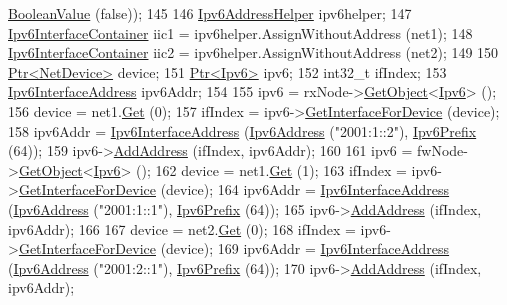 \begin{DoxyCode}
      \hyperlink{classns3_1_1BooleanValue}{BooleanValue} (\textcolor{keyword}{false}));
145 
146   \hyperlink{classns3_1_1Ipv6AddressHelper}{Ipv6AddressHelper} ipv6helper;
147   \hyperlink{classns3_1_1Ipv6InterfaceContainer}{Ipv6InterfaceContainer} iic1 = ipv6helper.AssignWithoutAddress (net1);
148   \hyperlink{classns3_1_1Ipv6InterfaceContainer}{Ipv6InterfaceContainer} iic2 = ipv6helper.AssignWithoutAddress (net2);
149 
150   \hyperlink{classns3_1_1Ptr}{Ptr<NetDevice>} device;
151   \hyperlink{classns3_1_1Ptr}{Ptr<Ipv6>} ipv6;
152   int32\_t ifIndex;
153   \hyperlink{classns3_1_1Ipv6InterfaceAddress}{Ipv6InterfaceAddress} ipv6Addr;
154 
155   ipv6 = rxNode->\hyperlink{classns3_1_1Object_a13e18c00017096c8381eb651d5bd0783}{GetObject}<\hyperlink{classns3_1_1Ipv6}{Ipv6}> ();
156   device = net1.\hyperlink{classns3_1_1NetDeviceContainer_a677d62594b5c9d2dea155cc5045f4d0b}{Get} (0);
157   ifIndex = ipv6->\hyperlink{classns3_1_1Ipv6_a3337dc6ce66612b0fa9b57f7f0338745}{GetInterfaceForDevice} (device);
158   ipv6Addr = \hyperlink{classns3_1_1Ipv6InterfaceAddress}{Ipv6InterfaceAddress} (\hyperlink{classns3_1_1Ipv6Address}{Ipv6Address} (\textcolor{stringliteral}{"2001:1::2"}), 
      \hyperlink{classns3_1_1Ipv6Prefix}{Ipv6Prefix} (64));
159   ipv6->\hyperlink{classns3_1_1Ipv6_a5cd576e83cf65445be3a0b5ffd1ddc5c}{AddAddress} (ifIndex, ipv6Addr);
160 
161   ipv6 = fwNode->\hyperlink{classns3_1_1Object_a13e18c00017096c8381eb651d5bd0783}{GetObject}<\hyperlink{classns3_1_1Ipv6}{Ipv6}> ();
162   device = net1.\hyperlink{classns3_1_1NetDeviceContainer_a677d62594b5c9d2dea155cc5045f4d0b}{Get} (1);
163   ifIndex = ipv6->\hyperlink{classns3_1_1Ipv6_a3337dc6ce66612b0fa9b57f7f0338745}{GetInterfaceForDevice} (device);
164   ipv6Addr = \hyperlink{classns3_1_1Ipv6InterfaceAddress}{Ipv6InterfaceAddress} (\hyperlink{classns3_1_1Ipv6Address}{Ipv6Address} (\textcolor{stringliteral}{"2001:1::1"}), 
      \hyperlink{classns3_1_1Ipv6Prefix}{Ipv6Prefix} (64));
165   ipv6->\hyperlink{classns3_1_1Ipv6_a5cd576e83cf65445be3a0b5ffd1ddc5c}{AddAddress} (ifIndex, ipv6Addr);
166 
167   device = net2.\hyperlink{classns3_1_1NetDeviceContainer_a677d62594b5c9d2dea155cc5045f4d0b}{Get} (0);
168   ifIndex = ipv6->\hyperlink{classns3_1_1Ipv6_a3337dc6ce66612b0fa9b57f7f0338745}{GetInterfaceForDevice} (device);
169   ipv6Addr = \hyperlink{classns3_1_1Ipv6InterfaceAddress}{Ipv6InterfaceAddress} (\hyperlink{classns3_1_1Ipv6Address}{Ipv6Address} (\textcolor{stringliteral}{"2001:2::1"}), 
      \hyperlink{classns3_1_1Ipv6Prefix}{Ipv6Prefix} (64));
170   ipv6->\hyperlink{classns3_1_1Ipv6_a5cd576e83cf65445be3a0b5ffd1ddc5c}{AddAddress} (ifIndex, ipv6Addr);

\end{DoxyCode}
